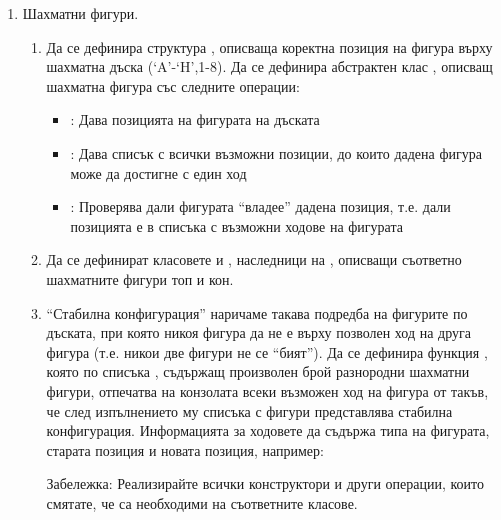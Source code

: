 \begin{enumerate}


    \item \label{zad:gamechess}Шахматни фигури.

    \begin{enumerate}[label=\alph*)]
      \item Да се дефинира структура , описваща коректна позиция на фигура върху шахматна дъска (‘A’-‘H’,1-8). Да се дефинира абстрактен клас , описващ шахматна фигура със следните операции:

      \begin{itemize}
      \item {}: Дава позицията на фигурата на дъската
      \item {}: Дава списък с всички възможни позиции, до които дадена фигура може да достигне с един ход
      \item {}: Проверява дали фигурата ``владее'' дадена позиция, т.е. дали позицията е в списъка с възможни ходове на фигурата
      \end{itemize}

      \item Да се дефинират класовете  и , наследници на , описващи съответно шахматните фигури топ и кон.

      \item ``Стабилна конфигурация'' наричаме такава подредба на фигурите по дъската, при която никоя фигура да не е върху позволен ход на друга фигура (т.е. никои две фигури не се ``бият''). Да се дефинира функция , която по списъка , съдържащ произволен брой разнородни шахматни фигури, отпечатва на конзолата всеки възможен ход на фигура от  такъв, че след изпълнението му списъка с фигури представлява стабилна конфигурация. Информацията за ходовете да съдържа типа на фигурата, старата позиция и новата позиция, например:



      \begin{flushleft}
      Забележка: Реализирайте всички конструктори и други операции, които смятате, че са необходими на съответните класове.\\


\end{flushleft}
\end{enumerate}
\end{enumerate}
